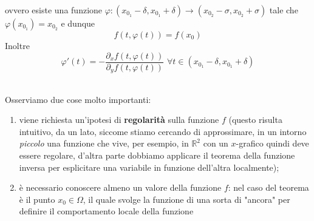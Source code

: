 \begin{theorem}
\begin{theorem}
ovvero esiste una funzione $\varphi: (x_{0_1} - \delta, x_{0_1} + \delta) \to (x_{0_2}-\sigma, x_{0_2} + \sigma)$ tale che $\varphi(x_{0_1}) = x_{0_2}$ e dunque
$$
f(t, \varphi(t)) = f(x_0)
$$
Inoltre
$$
\varphi'(t)=-\frac{\partial_x f(t, \varphi(t))}{\partial_y f(t, \varphi(t))} \, \, \forall t \in (x_{0_1} - \delta, x_{0_1} + \delta)
$$
\end{theorem}
\hspace{1cm} \\
Osserviamo due cose molto importanti:
\begin{enumerate}[label=\protect\circled{\arabic*}]
	\item viene richiesta un'ipotesi di \textbf{regolarità} sulla funzione $f$ (questo risulta intuitivo, da un lato, siccome stiamo cercando di approssimare, in un intorno \emph{piccolo} una funzione che vive, per esempio, in $\mathbb{R}^2$ con un $x$-grafico quindi deve essere regolare, d'altra parte dobbiamo applicare il teorema della funzione inversa per esplicitare una variabile in funzione dell'altra localmente);
	\item è necessario conoscere almeno un valore della funzione $f$: nel caso del teorema è il punto $x_0 \in \Omega$, il quale svolge la funzione di una sorta di "ancora" per definire il comportamento locale della funzione
\end{enumerate}
\end{theorem}
